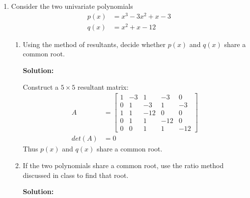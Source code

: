 \documentclass[conference,onecolumn]{IEEEtran}
\begin{document}
\begin{enumerate}[label=\arabic{enumi}.]
          \clearpage
    \item Consider the two univariate polynomials
          \begin{align*}
              p(x) & = x^3 - 3 x^2 + x - 3 \\
              q(x) & = x^2 + x - 12
          \end{align*}

          \begin{enumerate}
              \item Using the method of resultants, decide whether $p(x)$ and $q(x)$ share a common root.

                    \textbf{Solution:}

                    Construct a $5 \times 5$ resultant matrix:
                    \begin{align*}
                        A      & =
                        \begin{bmatrix}
                            1 & -3 & 1   & -3  & 0   \\
                            0 & 1  & -3  & 1   & -3  \\
                            1 & 1  & -12 & 0   & 0   \\
                            0 & 1  & 1   & -12 & 0   \\
                            0 & 0  & 1   & 1   & -12
                        \end{bmatrix} \\
                        det(A) & = 0
                    \end{align*}
                    Thus $p(x)$ and $q(x)$ share a common root.
              \item If the two polynomials share a common root, use the ratio method discussed in class to find that root.

                    \textbf{Solution:}


\end{enumerate}
\end{enumerate}
\end{document}
